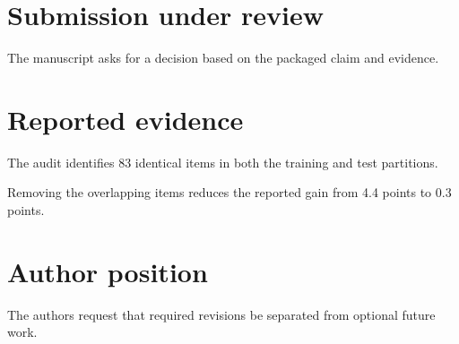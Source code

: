 \documentclass{article}
\begin{document}
\section{Submission under review}
The manuscript asks for a decision based on the packaged claim and evidence.
\section{Reported evidence}
The audit identifies 83 identical items in both the training and test partitions.

Removing the overlapping items reduces the reported gain from 4.4 points to 0.3 points.
\section{Author position}
The authors request that required revisions be separated from optional future work.
\end{document}
